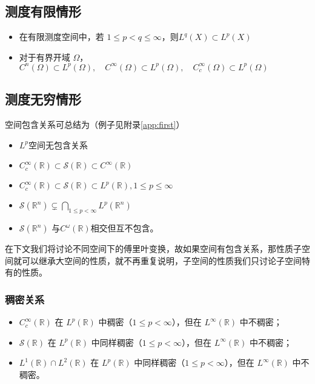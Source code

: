 \documentclass[12pt,a4paper]{article}
\theoremstyle{plain}
\theoremstyle{definition}
\theoremstyle{remark}
\begin{document}
	\subsection{测度有限情形 }
	\begin{itemize}
\item		在有限测度空间中，若 $1\leq p<q\le\infty$，则$	L^q(X)\subset L^p(X)$
\item	对于有界开域 $\Omega$，$	C^n(\Omega)\subset L^p(\Omega),\quad
	C^\infty(\Omega)\subset L^p(\Omega),\quad
	C_c^\infty(\Omega)\subset L^p(\Omega)$
\end{itemize}
	
	\subsection{测度无穷情形}
	空间包含关系可总结为（例子见附录\ref{app:first}）
\begin{itemize}
	\item$ L^p$空间无包含关系
\item	$	C_c^\infty(\mathbb{R}) \subset \mathcal{S}(\mathbb{R}) \subset C^\infty(\mathbb{R})$
\item	$C_c^\infty(\mathbb{R}) \subset \mathcal{S}(\mathbb{R}) \subset  L^p(\mathbb{R}) ,1\leq p\le\infty$
\item	$\mathcal{S}(\mathbb{R}^n) \subsetneq \bigcap_{1 \leq p < \infty} L^p(\mathbb{R}^n)$
\item	 $\mathcal{S}(\mathbb{R}^n)$ 与$ C^\omega(\mathbb{R})$相交但互不包含。
\end{itemize}
 
 
 
在下文我们将讨论不同空间下的傅里叶变换，故如果空间有包含关系，那性质子空间就可以继承大空间的性质，就不再重复说明，子空间的性质我们只讨论子空间特有的性质。

\subsubsection{稠密关系}
\begin{itemize}
\item $C_c^\infty(\mathbb{R})$ 在 $L^p(\mathbb{R})$ 中稠密（$1 \leq p < \infty$），但在 $L^\infty(\mathbb{R})$ 中不稠密；
 
	\item $\mathcal{S}(\mathbb{R})$ 在 $L^p(\mathbb{R})$ 中同样稠密（$1 \leq p < \infty$），但在 $L^\infty(\mathbb{R})$ 中不稠密；
	 
	 \item $ L^1(\mathbb{R}) \cap L^2(\mathbb{R})$ 在 $L^p(\mathbb{R})$ 中同样稠密（$1 \leq p < \infty$），但在 $L^\infty(\mathbb{R})$ 中不稠密。
	\end{itemize}
\end{document}
